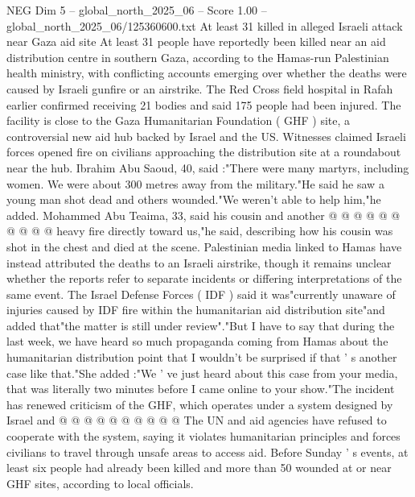 \begin{textsample}{NEG Dim 5 – global\_north\_2025\_06 – Score 1.00 – global\_north\_2025\_06/125360600.txt}  \label{ex:f5_neg_377}
At least 31 killed in alleged Israeli attack near Gaza aid site At least 31 people have reportedly been killed near an aid distribution centre in southern Gaza, according to the Hamas-run Palestinian health ministry, with conflicting accounts emerging over whether the deaths were caused by Israeli gunfire or an airstrike.
The Red Cross field hospital in Rafah earlier confirmed receiving 21 bodies and said 175 people had been injured.
The facility is close to the Gaza Humanitarian Foundation ( GHF ) site, a controversial new aid hub backed by Israel and the US.
Witnesses claimed Israeli forces opened fire on civilians approaching the distribution site at a roundabout near the hub.
Ibrahim Abu Saoud, 40, said :"There were many martyrs, including women.
We were about 300 metres away from the military."He said he saw a young man shot dead and others wounded."We weren't able to help him,"he added.
Mohammed Abu Teaima, 33, said his cousin and another @ @ @ @ @ @ @ @ @ @ heavy fire directly toward us,"he said, describing how his cousin was shot in the chest and died at the scene.
Palestinian media linked to Hamas have instead attributed the deaths to an Israeli airstrike, though it remains unclear whether the reports refer to separate incidents or differing interpretations of the same event.
The Israel Defense Forces ( IDF ) said it was"currently unaware of injuries caused by IDF fire within the humanitarian aid distribution site"and added that"the matter is still under review"."But I have to say that during the last week, we have heard so much propaganda coming from Hamas about the humanitarian distribution point that I wouldn't be surprised if that ' s another case like that."She added :"We ' ve just heard about this case from your media, that was literally two minutes before I came online to your show."The incident has renewed criticism of the GHF, which operates under a system designed by Israel and @ @ @ @ @ @ @ @ @ @ The UN and aid agencies have refused to cooperate with the system, saying it violates humanitarian principles and forces civilians to travel through unsafe areas to access aid.
Before Sunday ' s events, at least six people had already been killed and more than 50 wounded at or near GHF sites, according to local officials.

\end{textsample}
